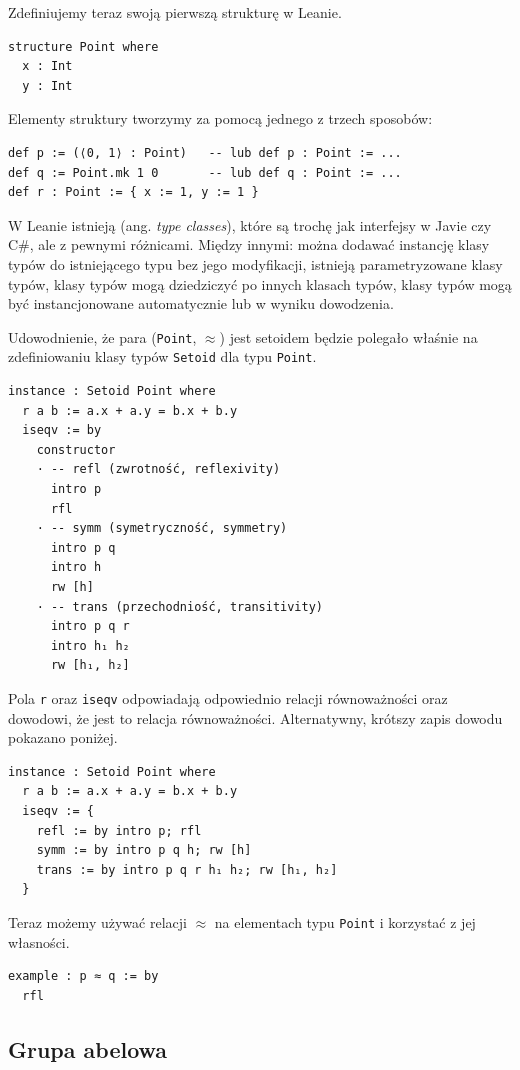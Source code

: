 \documentclass[polish,pretty,bibliography=totocnumbered]{angav}
\newcommand{\Lean}[1]{\texttt{#1}}
\begin{document}
Zdefiniujemy teraz swoją pierwszą strukturę w Leanie.
\begin{verbatim}
structure Point where
  x : Int
  y : Int
\end{verbatim}
Elementy struktury tworzymy za pomocą jednego z trzech sposobów:
\begin{verbatim}
def p := (⟨0, 1⟩ : Point)   -- lub def p : Point := ...
def q := Point.mk 1 0       -- lub def q : Point := ...
def r : Point := { x := 1, y := 1 }
\end{verbatim}

W Leanie istnieją  (ang. \textit{type classes}), które są trochę jak interfejsy w Javie czy C\#, ale z pewnymi różnicami. Między innymi: można dodawać instancję klasy typów do istniejącego typu bez jego modyfikacji, istnieją parametryzowane klasy typów, klasy typów mogą dziedziczyć po innych klasach typów, klasy typów mogą być instancjonowane automatycznie lub w wyniku dowodzenia.

Udowodnienie, że para (\Lean{Point}, $\approx$) jest setoidem będzie polegało właśnie na zdefiniowaniu  klasy typów \Lean{Setoid} dla typu \Lean{Point}.

\begin{verbatim}
instance : Setoid Point where
  r a b := a.x + a.y = b.x + b.y
  iseqv := by
    constructor
    · -- refl (zwrotność, reflexivity)
      intro p
      rfl
    · -- symm (symetryczność, symmetry)
      intro p q
      intro h
      rw [h]
    · -- trans (przechodniość, transitivity)
      intro p q r
      intro h₁ h₂
      rw [h₁, h₂]
\end{verbatim}
Pola \Lean{r} oraz \Lean{iseqv} odpowiadają odpowiednio relacji równoważności oraz dowodowi, że jest to relacja równoważności. Alternatywny, krótszy zapis dowodu pokazano poniżej.
\begin{verbatim}
instance : Setoid Point where
  r a b := a.x + a.y = b.x + b.y
  iseqv := {
    refl := by intro p; rfl
    symm := by intro p q h; rw [h]
    trans := by intro p q r h₁ h₂; rw [h₁, h₂]
  }
\end{verbatim}

Teraz możemy używać relacji $\approx$ na elementach typu \Lean{Point} i korzystać z jej własności.
\begin{verbatim}
example : p ≈ q := by
  rfl
\end{verbatim}

\subsection{Grupa abelowa}
\end{document}
